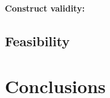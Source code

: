 \documentclass{sig-alternate}
\begin{document}
\textbf{ Construct validity: } 


\subsection{Feasibility}




\section{Conclusions}
\label{conclusion}

%

%
%
\end{document}
